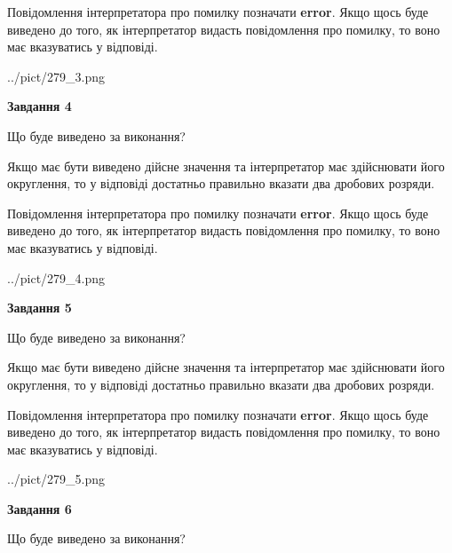 \documentclass[12pt, ukrainian]{article}
\begin{document}
{\begin {Large}
Повідомлення інтерпретатора про помилку позначати \textbf{error}.
Якщо щось буде виведено до того, як інтерпретатор видасть повідомлення про помилку, 
то воно має вказуватись у відповіді. \par

\begin{center}
	{../pict/279_3.png}
\end{center}
\newpage

{\begin {center}\textbf{Завдання 4}\end {center}}\par
Що буде виведено за виконання? \par

Якщо має бути виведено дійсне значення та інтерпретатор має здійснювати його округлення, 
то у відповіді достатньо правильно вказати два дробових розряди.

Повідомлення інтерпретатора про помилку позначати \textbf{error}.
Якщо щось буде виведено до того, як інтерпретатор видасть повідомлення про помилку, 
то воно має вказуватись у відповіді. \par

\begin{center}
	{../pict/279_4.png}
\end{center}
\newpage

{\begin {center}\textbf{Завдання 5}\end {center}}\par
Що буде виведено за виконання? \par

Якщо має бути виведено дійсне значення та інтерпретатор має здійснювати його округлення, 
то у відповіді достатньо правильно вказати два дробових розряди.

Повідомлення інтерпретатора про помилку позначати \textbf{error}.
Якщо щось буде виведено до того, як інтерпретатор видасть повідомлення про помилку, 
то воно має вказуватись у відповіді. \par

\begin{center}
	{../pict/279_5.png}
\end{center}
\newpage

{\begin {center}\textbf{Завдання 6}\end {center}}\par
Що буде виведено за виконання? \par


\end{Large}}
\end{document}
